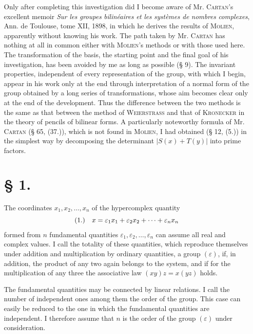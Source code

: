 \documentclass[11pt]{article}
\newcommand{\eps}{\varepsilon}
\newcommand{\fnum}[1]{\textup{(\ensuremath{#1}.)}\quad}
\begin{document}
Only after completing this investigation did I become aware of Mr. \textsc{Cartan}'s excellent memoir \emph{Sur les groupes bilinéaires et les systèmes de nombres complexes}, Ann. de Toulouse, tome XII, 1898, in which he derives the results of \textsc{Molien}, apparently without knowing his work. The path taken by Mr. \textsc{Cartan} has nothing at all in common either with \textsc{Molien}'s methods or with those used here. The transformation of the basis, the starting point and the final goal of his investigation, has been avoided by me as long as possible (§ 9). The invariant properties, independent of every representation of the group, with which I begin, appear in his work only at the end through interpretation of a normal form of the group obtained by a long series of transformations, whose aim becomes clear only at the end of the development. Thus the difference between the two methods is the same as that between the method of \textsc{Weierstrass} and that of \textsc{Kronecker} in the theory of pencils of bilinear forms. A particularly noteworthy formula of Mr. \textsc{Cartan} (§ 65, (37.)), which is not found in \textsc{Molien}, I had obtained (§ 12, (5.)) in the simplest way by decomposing the determinant $|S(x)+T(y)|$ into prime factors.

\section*{§ 1.}

The coordinates $x_1,x_2,\ldots,x_n$ of the hypercomplex quantity
\[
\fnum{1} x=\eps_1x_1+\eps_2x_2+\cdots+\eps_nx_n
\]
formed from $n$ fundamental quantities $\eps_1,\eps_2,\ldots,\eps_n$ can assume all real and complex values. I call the totality of these quantities, which reproduce themselves under addition and multiplication by ordinary quantities, a group $(\eps)$, if, in addition, the product of any two again belongs to the system, and if for the multiplication of any three the associative law $(xy)z=x(yz)$ holds.

The fundamental quantities may be connected by linear relations. I call the number of independent ones among them the order of the group. This case can easily be reduced to the one in which the fundamental quantities are independent. I therefore assume that $n$ is the order of the group $(\eps)$ under consideration.
\end{document}
